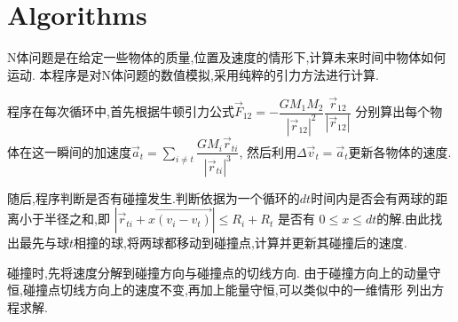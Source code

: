 \section{Algorithms}
\label{sec:theory}
N体问题\cite{nbody}是在给定一些物体的质量,位置及速度的情形下,计算未来时间中物体如何运动.
本程序是对N体问题的数值模拟,采用纯粹的引力方法\cite{simulation}进行计算.

程序在每次循环中,首先根据牛顿引力公式$ \overrightarrow F_{12} = -\dfrac{GM_1M_2}{|\overrightarrow r_{12}|^2} \dfrac{\overrightarrow r_{12}}{|\overrightarrow r_{12}|}$
分别算出每个物体在这一瞬间的加速度$ \overrightarrow a_t = \sum_{i \ne t}{\dfrac{GM_i \overrightarrow r_{ti}}{|\overrightarrow r_{ti}| ^3} }$,
然后利用$ \Delta \overrightarrow v_t = \overrightarrow a_t$更新各物体的速度.

随后,程序判断是否有碰撞发生.判断依据为一个循环的$ dt$时间内是否会有两球的距离小于半径之和,即
$|\overrightarrow r_{ti} +  x\overrightarrow{(v_i - v_t)}| \le R_i + R_t$
是否有 $ 0\le x \le dt$的解.由此找出最先与球$ t$相撞的球,将两球都移动到碰撞点,计算并更新其碰撞后的速度.

碰撞时,先将速度分解到碰撞方向与碰撞点的切线方向.
由于碰撞方向上的动量守恒,碰撞点切线方向上的速度不变,再加上能量守恒,可以类似\cite{collision}中的一维情形
列出方程求解.
